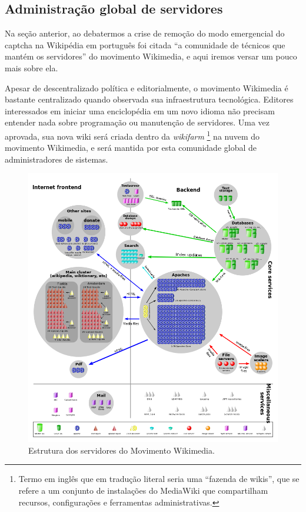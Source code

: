 \subsection{Administração global de servidores}

Na seção anterior, ao debatermos a crise de remoção do modo emergencial do captcha na Wikipédia em português foi citada ``a comunidade de técnicos que mantém os servidores'' do movimento Wikimedia, e aqui iremos versar um pouco mais sobre ela.

Apesar de descentralizado política e editorialmente, o movimento Wikimedia é bastante centralizado quando observada sua infraestrutura tecnológica.  Editores interessados em iniciar uma enciclopédia em um novo idioma não precisam entender nada sobre programação ou manutenção de servidores. Uma vez aprovada, sua nova wiki será criada dentro da \textit{wikifarm} \footnote{Termo em inglês que em tradução literal seria uma ``fazenda de wikis'', que se refere a um conjunto de instalações do MediaWiki que compartilham recursos, configurações e ferramentas administrativas.} na nuvem do movimento Wikimedia, e será mantida por esta comunidade global de administradores de sistemas.

\begin{figure}
    \centering
    \includegraphics[width=1\textwidth]{Images/servidores_movimento_wikimedia.png}
    \caption{Estrutura dos servidores do Movimento Wikimedia. }
    \label{fig:servidores_movimento_wikimedia}
\end{figure}

